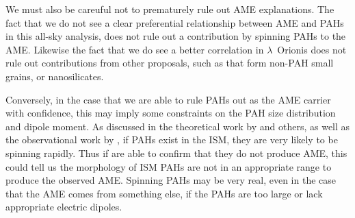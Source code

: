                 We must also be careuful not to prematurely rule out AME explanations. The fact that we do not see a clear preferential relationship between AME and PAHs in this all-sky analysis, does not rule out a contribution by spinning PAHs to the AME. Likewise the fact that we do see a better correlation in $\lambda$~Orionis does not rule out contributions from other proposals, such as that form non-PAH small grains, or nanosilicates.

                Conversely, in the case that we are able to rule PAHs out as the AME carrier with confidence, this may imply some constraints on the PAH size distribution and dipole moment. As discussed in the theoretical work by \cite{draine98a, ali-haimoud10} and others, as well as the observational work by \cite{hensley16}, if PAHs exist in the ISM, they are very likely to be spinning rapidly. Thus if are able to confirm that they do not produce AME, this could tell us the morphology of ISM PAHs are not in an appropriate range to produce the observed AME. Spinning PAHs may be very real, even in the case that the AME comes from something else, if the PAHs are too large or lack appropriate electric dipoles.
